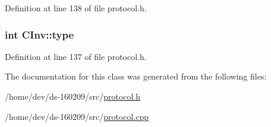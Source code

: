 Definition at line 138 of file protocol.\+h.

\hypertarget{class_c_inv_a2da8a26c6b8824011e3144459d278c75}{}
\subsubsection[{type}]{\setlength{\rightskip}{0pt plus 5cm}int C\+Inv\+::type}\label{class_c_inv_a2da8a26c6b8824011e3144459d278c75}


Definition at line 137 of file protocol.\+h.



The documentation for this class was generated from the following files\+:\begin{DoxyCompactItemize}
\item 
/home/dev/ds-\/160209/src/\hyperlink{protocol_8h}{protocol.\+h}\item 
/home/dev/ds-\/160209/src/\hyperlink{protocol_8cpp}{protocol.\+cpp}\end{DoxyCompactItemize}

